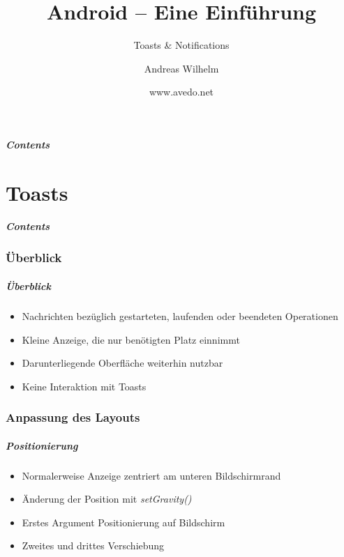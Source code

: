 \title{Android -- Eine Einführung}
\subtitle{Toasts \& Notifications}
\author[A. Wilhelm]{Andreas Wilhelm}
\titlegraphic{}
\date{www.avedo.net}

\begin{frame}[plain]
  \titlepage
\end{frame}

\section[Contents]{}
\begin{frame}
	\frametitle{Contents}
	\tableofcontents[onlyparts]
\end{frame}

\part{Toasts}
\frame{\partpage}
\begin{frame}
	\frametitle{Contents}
	\tableofcontents[]
\end{frame}

\section{Überblick}
\begin{frame}
   \frametitle{Überblick}
   \begin{itemize}
      \item Nachrichten bezüglich gestarteten, laufenden oder beendeten 
         Operationen
      \item Kleine Anzeige, die nur benötigten Platz einnimmt
      \item Darunterliegende Oberfläche weiterhin nutzbar
      \item Keine Interaktion mit Toasts
   \end{itemize}

   
\end{frame}

\section{Anpassung des Layouts}
\begin{frame}
   \frametitle{Positionierung}
   \begin{itemize}
      \item Normalerweise Anzeige zentriert am unteren Bildschirmrand
      \item Änderung der Position mit \emph{setGravity()}
      \item Erstes Argument Positionierung auf Bildschirm
      \item Zweites und drittes Verschiebung
   \end{itemize}

   
\end{frame}

